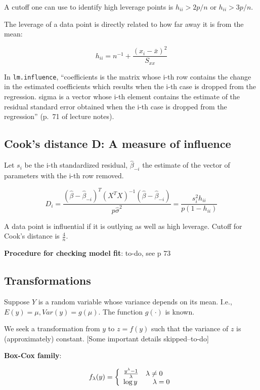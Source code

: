 A cutoff one can use to identify high leverage points is $h_{ii} > 2p/n$ or $h_{ii} > 3p/n$.

The leverage of a data point is directly related to how far away it is from the mean:

\begin{equation}
h_{ii} = n^{-1} + \frac{(x_i - \bar{x})^2}{S_{xx}}
\end{equation}

In \texttt{lm.influence}, ``coefficients is the matrix whose i-th row contains the change in the estimated coefficients which results when the i-th case is dropped from the regression. sigma is a vector whose i-th element contains the estimate of the residual standard error obtained when the i-th case is dropped from the regression'' (p.\ 71 of lecture notes).

\subsection{Cook's distance D: A measure of influence}

Let $s_i$ be the i-th standardized residual, $\hat{\beta}_{-i}$ the estimate of the vector of parameters with the i-th row removed.

\begin{equation}
D_i =  \frac{(\hat{\beta}-\hat{\beta}_{-i})^T(X^T X)^{-1}(\hat{\beta}-\hat{\beta}_{-i})}{p\hat{\sigma}^2} = \frac{s_i^2 h_{ii}}{p(1-h_{ii})}
\end{equation}

A data point is influential if it is outlying as well as high leverage. Cutoff for Cook's distance is $\frac{4}{n}$.

\textbf{Procedure for checking model fit}:
to-do, see p 73

\subsection{Transformations}

Suppose $Y$ is a random variable whose variance depends on its mean. I.e., $E(y)=\mu, Var(y)=g(\mu)$.
The function $g(\cdot)$ is known.

We seek a transformation from $y$ to $z = f(y)$ such that the variance of $z$ is (approximately) constant. [Some important details skipped--to-do]

\textbf{Box-Cox family}:

\begin{equation}
f_\lambda (y) = \left\{ 
\begin{array}{l l}
       \frac{y^\lambda - 1}{\lambda}   & \lambda \neq 0\\
       \log y & \quad \lambda=0\\
\end{array}
\right.
\end{equation}

